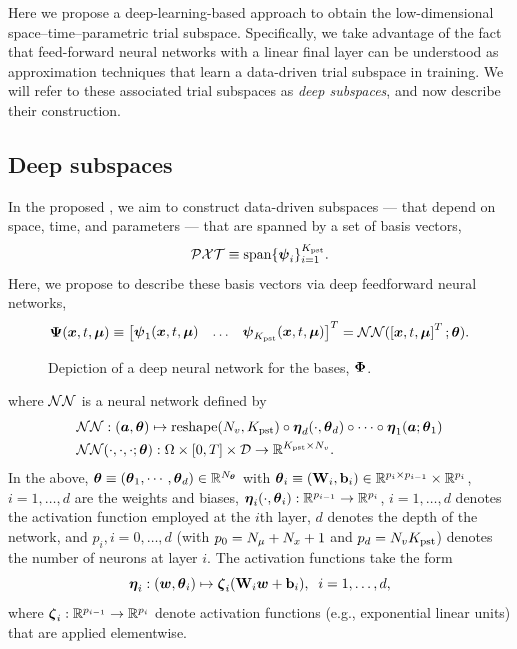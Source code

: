 \documentclass[3p,computermodern,10pt]{elsarticle}
\begin{document}
Here we propose a deep-learning-based approach to obtain the low-dimensional space--time--parametric trial subspace. Specifically, we take advantage of the fact that feed-forward neural networks with a linear final layer can be understood as approximation techniques that learn a data-driven trial subspace in training. We will refer to these associated trial subspaces as \textit{deep subspaces}, and now describe their construction. 
\subsection{Deep subspaces}
In the proposed \MLSubspaceNameLowercase, we aim to construct data-driven subspaces --- that depend on space, time, and parameters --- that are spanned by a set of basis vectors, 
$$\mathcal{PXT} \equiv \text{span}\{\boldsymbol \psi_i\}_{i=1}^{K_{\text{pst}}}.$$
Here, we propose to describe these basis vectors via deep feedforward neural networks,
$$\boldsymbol \Psi (\boldsymbol x, t,\boldsymbol \mu)\equiv \begin{bmatrix} \boldsymbol \psi_1(\boldsymbol x, t,\boldsymbol \mu) &
\hdots & 
 \boldsymbol \psi_{K_{\text{pst}}}(\boldsymbol x, t,\boldsymbol \mu) \end{bmatrix}^T
= \mathcal{NN}(\left[\boldsymbol x, t,\boldsymbol \mu\right]^T;\boldsymbol \theta).
$$
\begin{figure}
\begin{center}

\caption{Depiction of a deep neural network for the bases, $\boldsymbol \Phi$.}
\end{center}
\end{figure}
where $\mathcal{NN}$ is a neural network defined by
\begin{align}
&\mathcal{NN} : (\boldsymbol a,\boldsymbol \theta) \mapsto    \text{reshape}(N_v,K_{\text{pst}}) \circ \boldsymbol \eta_d(\cdot,\boldsymbol \theta_d) \circ \cdots \circ \boldsymbol \eta_1(\boldsymbol a; \boldsymbol \theta_1) \\
&\mathcal{NN}(\cdot,\cdot,\cdot;\boldsymbol \theta) : \Omega \times [0,T] \times \mathcal{D} \rightarrow \mathbb{R}^{K_{\text{pst}} \times N_v}.
\end{align}
In the above, $\boldsymbol \theta \equiv (\boldsymbol \theta_1,\cdots,\boldsymbol \theta_d) \in \mathbb{R}^{N_{\boldsymbol \theta}}$ with $\boldsymbol \theta_i \equiv (\mathbf{W}_i,\mathbf{b}_i) \in \mathbb{R}^{p_i \times p_{i-1}} \times \mathbb{R}^{p_i}$, $i=1,\ldots,d$ are the weights and biases, $\boldsymbol \eta_i(\cdot,\boldsymbol \theta_i) : \mathbb{R}^{p_{i-1}} \rightarrow \mathbb{R}^{p_i}$, $i=1,\ldots,d$ denotes the activation function employed at the $i$th layer,
 $d$ denotes the depth of the network, and $p_i, i=0,\ldots,d$ (with $p_0 = N_{\mu} + N_x + 1$ and $p_d = N_v K_{\text{pst}}$) denotes the number of neurons at layer $i$. The activation functions take the form
$$\boldsymbol \eta_i: (\boldsymbol w, \boldsymbol \theta_i) \mapsto \boldsymbol \zeta_i(\mathbf{W}_i \boldsymbol w + \mathbf{b}_i), \; \; i=1,\ldots,d,$$
where $\boldsymbol \zeta_i : \mathbb{R}^{p_{i-1}} \rightarrow \mathbb{R}^{p_i}$ denote activation functions (e.g., exponential linear units) that are applied elementwise.  
\end{document}
